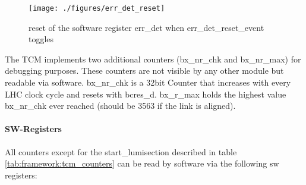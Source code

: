 \begin{figure}[ht]
  \texttt{[image: ./figures/err\_det\_reset]}
  \caption{reset of the software register err\_det when err\_det\_reset\_event toggles}
  \label{fig:err_det_reset}
\end{figure}

The TCM implements two additional counters (bx\_nr\_chk and bx\_nr\_max) for debugging purposes. These counters are not visible by any other module but readable via software. bx\_nr\_chk is a 32bit Counter that increases with every LHC clock cycle and resets with bcres\_d. bx\_r\_max holds the highest value bx\_nr\_chk ever reached (should be 3563 if the link is aligned).

\paragraph{SW-Registers}
All counters except for the start\_lumisection described in table \ref{tab:framework:tcm_counters} can be read by software via the following sw registers:

